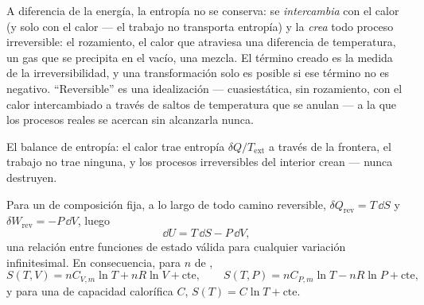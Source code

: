 \begin{remark}\label{rem:b1:second-law-entropy:reading}
A diferencia de la energía, la entropía no se conserva: se
\emph{intercambia} con el calor (y solo con el calor --- el trabajo no
transporta entropía) y la \emph{crea} todo proceso irreversible: el
rozamiento, el calor que atraviesa una diferencia de temperatura, un gas
que se precipita en el vacío, una mezcla. El término creado es la medida
de la irreversibilidad, y una transformación solo es posible si ese
término no es negativo. ``Reversible'' es una idealización
--- cuasiestática, sin rozamiento, con el calor intercambiado a través de
saltos de temperatura que se anulan --- a la que los procesos reales se
acercan sin alcanzarla nunca.
\end{remark}

\begin{omfigure}

{\small El balance de entropía: el calor trae entropía $\delta Q/T_{\mathrm{ext}}$
a través de la frontera, el trabajo no trae ninguna, y los procesos
irreversibles del interior crean --- nunca destruyen.}
\end{omfigure}

\begin{proposition}\label{prop:b1:second-law-entropy:identity}
Para un  de composición fija, a lo largo de todo camino
reversible, $\delta Q_{\mathrm{rev}} = T\,\dd S$ y $\delta W_{\mathrm{rev}} = -P\,\dd V$, luego
\[
\dd U = T\,\dd S - P\,\dd V ,
\]
una relación entre funciones de estado válida para cualquier variación
infinitesimal. En consecuencia, para $n$  de ,
\[
S(T, V) = nC_{V,m}\ln T + nR\ln V + \text{cte}, \qquad
S(T, P) = nC_{P,m}\ln T - nR\ln P + \text{cte},
\]
y para una  de capacidad calorífica $C$, $S(T) = C\ln T + \text{cte}$.
\end{proposition}

